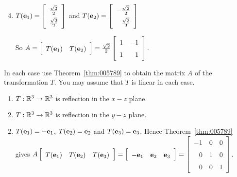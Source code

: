 \begin{multicols}{2}
\begin{ex}
\begin{sol}
\begin{enumerate}[label={\alph*.}]
\setcounter{enumi}{3}
\item $T(\vect{e}_{1}) = \leftB \def\arraystretch{1.5}\begin{array}{r}
\frac{\sqrt{2}}{2} \\
\frac{\sqrt{2}}{2}
\end{array} \rightB$
 and $T(\vect{e}_{2}) = \leftB \def\arraystretch{1.5}\begin{array}{r}
 -\frac{\sqrt{2}}{2} \\
 \frac{\sqrt{2}}{2}
 \end{array} \rightB$

So $A = \leftB \begin{array}{cc}
T(\vect{e}_{1}) & T(\vect{e}_{2})
\end{array} \rightB = \frac{\sqrt{2}}{2} \leftB \begin{array}{rr}
1 & -1 \\
1 & 1
\end{array} \rightB$.
\end{enumerate}
\end{sol}
\end{ex}

\begin{ex}
In each case use Theorem~\ref{thm:005789} to obtain the matrix $A$ of the transformation $T$. You may assume that $T$ is linear in each case.

\begin{enumerate}[label={\alph*.}]
\item $T : \mathbb{R}^3 \to \mathbb{R}^3$ is reflection in the $x-z$ plane.

\item $T : \mathbb{R}^3 \to \mathbb{R}^3$ is reflection in the $y-z$ plane.

\end{enumerate}
\begin{sol}
\begin{enumerate}[label={\alph*.}]
\setcounter{enumi}{1}
\item  $T(\textbf{e}_{1}) = -\textbf{e}_{1}$, $T(\textbf{e}_{2}) = \textbf{e}_{2}$ and $T(\textbf{e}_{3}) = \textbf{e}_{3}$. Hence Theorem~\ref{thm:005789} gives $A\leftB \begin{array}{ccc}
T(\vect{e}_{1}) & T(\vect{e}_{2}) & T(\vect{e}_{3})
\end{array} \rightB = \leftB \begin{array}{ccc}
-\vect{e}_{1} & \vect{e}_{2} & \vect{e}_{3}
\end{array} \rightB = \leftB \begin{array}{rrr}
-1 & 0 & 0 \\
0 & 1 & 0 \\
0 & 0 & 1
\end{array} \rightB$.


\end{enumerate}
\end{sol}
\end{ex}
\end{multicols}
